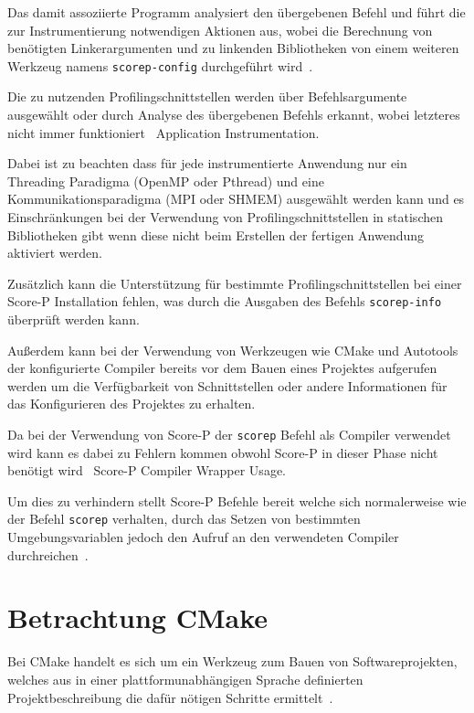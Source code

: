 \documentclass[german,proseminar,hyperref,utf8,lof]{zihpub}
\begin{document}
    Das damit assoziierte Programm analysiert den übergebenen Befehl und führt die zur Instrumentierung
    notwendigen Aktionen aus, wobei die Berechnung von benötigten Linkerargumenten und zu linkenden
    Bibliotheken von einem weiteren Werkzeug namens \texttt{scorep-config} durchgeführt
    wird~.

    Die zu nutzenden Profilingschnittstellen werden über Befehlsargumente ausgewählt oder durch
    Analyse des übergebenen Befehls erkannt, wobei letzteres nicht immer funktioniert~
    {Application Instrumentation}.

    Dabei ist zu beachten dass für jede instrumentierte Anwendung nur ein Threading Paradigma
    (OpenMP oder Pthread) und eine Kommunikationsparadigma (MPI oder SHMEM) ausgewählt werden kann
    und es Einschränkungen bei der Verwendung von Profilingschnittstellen in statischen
    Bibliotheken gibt wenn diese nicht beim Erstellen der fertigen Anwendung aktiviert werden.

    Zusätzlich kann die Unterstützung für bestimmte Profilingschnittstellen bei einer Score-P
    Installation fehlen, was durch die Ausgaben des Befehls \texttt{scorep-info} überprüft werden kann.

    Au{\ss}erdem kann bei der Verwendung von Werkzeugen wie CMake und Autotools der konfigurierte Compiler
    bereits vor dem Bauen eines Projektes aufgerufen werden um die Verfügbarkeit von Schnittstellen
    oder andere Informationen für das Konfigurieren des Projektes zu erhalten.

    Da bei der Verwendung von Score-P der \texttt{scorep} Befehl als Compiler verwendet wird kann es dabei
    zu Fehlern kommen obwohl Score-P in dieser Phase nicht benötigt wird~
    {Score-P Compiler Wrapper Usage}.

    Um dies zu verhindern stellt Score-P Befehle bereit welche sich normalerweise wie der Befehl
    \texttt{scorep} verhalten, durch das Setzen von bestimmten Umgebungsvariablen jedoch den Aufruf an den
    verwendeten Compiler durchreichen~.

    \newpage
    \section{Betrachtung CMake}
    Bei CMake handelt es sich um ein Werkzeug zum Bauen von Softwareprojekten, welches aus in einer
    plattformunabhängigen Sprache definierten Projektbeschreibung die dafür nötigen Schritte
    ermittelt~.
\end{document}
